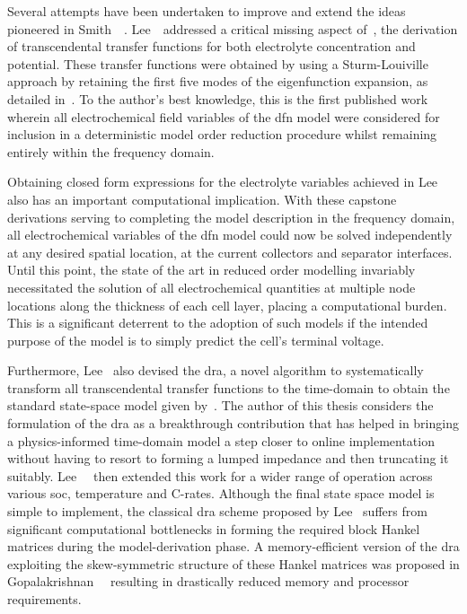 Several attempts have been undertaken to  improve and extend the ideas pioneered
in  Smith~\etal{}~\cite{Smith2007}.  Lee~\etal{}~addressed  a  critical  missing
aspect  of~\cite{Smith2007}, \viz{}  the derivation  of transcendental  transfer
functions  for  both electrolyte  concentration  and  potential. These  transfer
functions were  obtained by  using a Sturm-Louiville  approach by  retaining the
first five modes of the  eigenfunction expansion, as detailed in~\cite{Lee2012}.
To the  author's best knowledge,  this is the  first published work  wherein all
electrochemical  field variables  of  the \gls{dfn}  model  were considered  for
inclusion in  a deterministic model  order reduction procedure  whilst remaining
entirely within the frequency domain.


Obtaining  closed form  expressions for  the electrolyte  variables achieved  in
Lee~\etal{} also has an important computational implication. With these capstone
derivations serving to completing the model description in the frequency domain,
all  electrochemical  variables of  the  \gls{dfn}  model  could now  be  solved
independently at any  desired spatial location, \eg{} at  the current collectors
and separator  interfaces. Until  this point,  the state of  the art  in reduced
order  modelling invariably  necessitated  the solution  of all  electrochemical
quantities at  multiple node locations along  the thickness of each  cell layer,
placing a computational burden. This is  a significant deterrent to the adoption
of such  models if the intended  purpose of the  model is to simply  predict the
cell's terminal voltage.


Furthermore,  Lee~\etal{}   also  devised  the  \gls{dra},   a  novel  algorithm
to  systematically  transform  all  transcendental  transfer  functions  to  the
time-domain to  obtain the standard state-space  model given by~\cite{Lee2012a}.
The  author of  this thesis  considers  the formulation  of the  \gls{dra} as  a
breakthrough  contribution  that  has  helped  in  bringing  a  physics-informed
time-domain  model  a  step  closer  to  online  implementation  without  having
to  resort to  forming  a  lumped impedance  and  then  truncating it  suitably.
Lee~\etal{}~\cite{Lee2014}  then  extended  this  work  for  a  wider  range  of
operation  across  various  \gls{soc},  temperature and  C-rates.  Although  the
final  state  space  model  is  simple to  implement,  the  classical  \gls{dra}
scheme   proposed  by   Lee~\etal{}   suffers   from  significant   computational
bottlenecks  in   forming  the  required   block  Hankel  matrices   during  the
model-derivation phase.  A memory-efficient version of  the \gls{dra} exploiting
the   skew-symmetric   structure  of   these   Hankel   matrices  was   proposed
in  Gopalakrishnan~\etal{}~\cite{Gopalakrishnan2017}  resulting  in  drastically
reduced memory and processor requirements.


